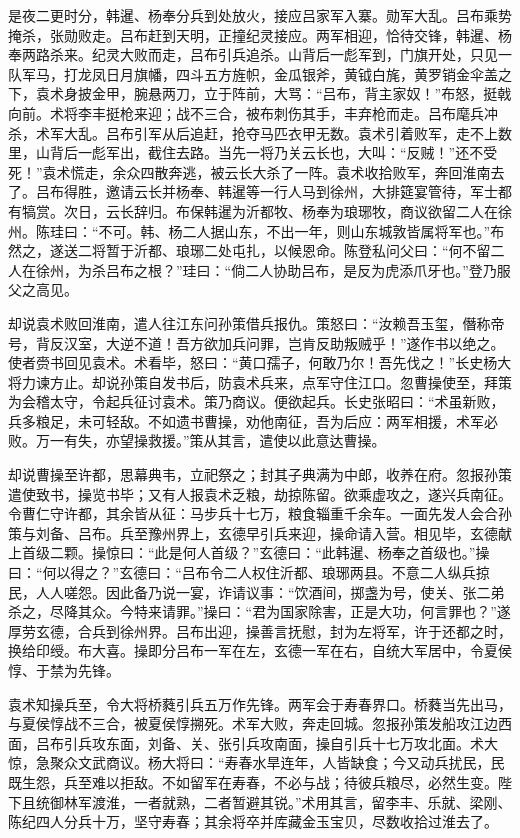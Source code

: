 是夜二更时分，韩暹、杨奉分兵到处放火，接应吕家军入寨。勋军大乱。吕布乘势掩杀，张勋败走。吕布赶到天明，正撞纪灵接应。两军相迎，恰待交锋，韩暹、杨奉两路杀来。纪灵大败而走，吕布引兵追杀。山背后一彪军到，门旗开处，只见一队军马，打龙凤日月旗幡，四斗五方旌帜，金瓜银斧，黄钺白旄，黄罗销金伞盖之下，袁术身披金甲，腕悬两刀，立于阵前，大骂：“吕布，背主家奴！”布怒，挺戟向前。术将李丰挺枪来迎；战不三合，被布刺伤其手，丰弃枪而走。吕布麾兵冲杀，术军大乱。吕布引军从后追赶，抢夺马匹衣甲无数。袁术引着败军，走不上数里，山背后一彪军出，截住去路。当先一将乃关云长也，大叫：“反贼！”还不受死！”袁术慌走，余众四散奔逃，被云长大杀了一阵。袁术收拾败军，奔回淮南去了。吕布得胜，邀请云长并杨奉、韩暹等一行人马到徐州，大排筵宴管待，军士都有犒赏。次日，云长辞归。布保韩暹为沂都牧、杨奉为琅琊牧，商议欲留二人在徐州。陈珪曰：“不可。韩、杨二人据山东，不出一年，则山东城敦皆属将军也。”布然之，遂送二将暂于沂都、琅琊二处屯扎，以候恩命。陈登私问父曰：“何不留二人在徐州，为杀吕布之根？”珪曰：“倘二人协助吕布，是反为虎添爪牙也。”登乃服父之高见。

却说袁术败回淮南，遣人往江东问孙策借兵报仇。策怒曰：“汝赖吾玉玺，僭称帝号，背反汉室，大逆不道！吾方欲加兵问罪，岂肯反助叛贼乎！”遂作书以绝之。使者赍书回见袁术。术看毕，怒曰：“黄口孺子，何敢乃尔！吾先伐之！”长史杨大将力谏方止。却说孙策自发书后，防袁术兵来，点军守住江口。忽曹操使至，拜策为会稽太守，令起兵征讨袁术。策乃商议。便欲起兵。长史张昭曰：“术虽新败，兵多粮足，未可轻敌。不如遗书曹操，劝他南征，吾为后应：两军相援，术军必败。万一有失，亦望操救援。”策从其言，遣使以此意达曹操。

却说曹操至许都，思幕典韦，立祀祭之；封其子典满为中郎，收养在府。忽报孙策遣使致书，操览书毕；又有人报袁术乏粮，劫掠陈留。欲乘虚攻之，遂兴兵南征。令曹仁守许都，其余皆从征：马步兵十七万，粮食辎重千余车。一面先发人会合孙策与刘备、吕布。兵至豫州界上，玄德早引兵来迎，操命请入营。相见毕，玄德献上首级二颗。操惊曰：“此是何人首级？”玄德曰：“此韩暹、杨奉之首级也。”操曰：“何以得之？”玄德曰：“吕布令二人权住沂都、琅琊两县。不意二人纵兵掠民，人人嗟怨。因此备乃说一宴，诈请议事：“饮酒间，掷盏为号，使关、张二弟杀之，尽降其众。今特来请罪。”操曰：“君为国家除害，正是大功，何言罪也？”遂厚劳玄德，合兵到徐州界。吕布出迎，操善言抚慰，封为左将军，许于还都之时，换给印绶。布大喜。操即分吕布一军在左，玄德一军在右，自统大军居中，令夏侯惇、于禁为先锋。

袁术知操兵至，令大将桥蕤引兵五万作先锋。两军会于寿春界口。桥蕤当先出马，与夏侯惇战不三合，被夏侯惇搠死。术军大败，奔走回城。忽报孙策发船攻江边西面，吕布引兵攻东面，刘备、关、张引兵攻南面，操自引兵十七万攻北面。术大惊，急聚众文武商议。杨大将曰：“寿春水旱连年，人皆缺食；今又动兵扰民，民既生怨，兵至难以拒敌。不如留军在寿春，不必与战；待彼兵粮尽，必然生变。陛下且统御林军渡淮，一者就熟，二者暂避其锐。”术用其言，留李丰、乐就、梁刚、陈纪四人分兵十万，坚守寿春；其余将卒并库藏金玉宝贝，尽数收拾过淮去了。


